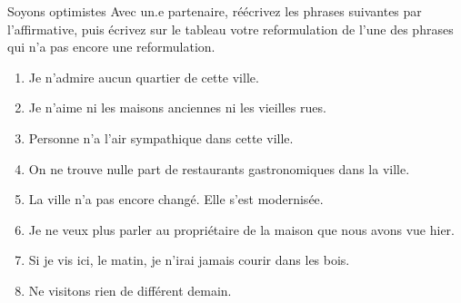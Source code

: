 \begin{frame}{Soyons optimistes}
  Avec un.e partenaire, réécrivez les phrases suivantes par l'affirmative, puis \alert{écrivez sur le tableau} votre reformulation de l'une des phrases qui n'a pas encore une reformulation.
  \begin{enumerate}
    \item Je n'admire aucun quartier de cette ville.
    \item Je n'aime ni les maisons anciennes ni les vieilles rues.
    \item Personne n'a l'air sympathique dans cette ville.
    \item On ne trouve nulle part de restaurants gastronomiques dans la ville.
    \item La ville n'a pas encore changé. Elle s'est modernisée.
    \item Je ne veux plus parler au propriétaire de la maison que nous avons vue hier.
    \item Si je vis ici, le matin, je n'irai jamais courir dans les bois.
    \item Ne visitons rien de différent demain.
  \end{enumerate}
\end{frame}